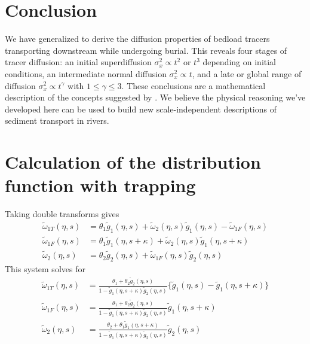 \documentclass[]{agujournal2018}
\newcommand\tom{\tilde{\omega}}
\newcommand\tg{\tilde{g}}
\begin{document}
\section{Conclusion}
We have generalized \citet{Einstein1937} to derive the diffusion properties of bedload tracers transporting downstream while undergoing burial.
This reveals four stages of tracer diffusion: an initial superdiffusion $\sigma_x^2 \propto t^2$ or $t^3$ depending on initial conditions, an intermediate normal diffusion $\sigma_x^2 \propto t$, and a late or global range of diffusion $\sigma_x^2 \propto t^\gamma$ with $1\leq \gamma \leq 3$.
These conclusions are a mathematical description of the concepts suggested by \citet{Nikora2001,Nikora2002}. 
We believe the physical reasoning we've developed here can be used to build new scale-independent descriptions of sediment transport in rivers.

\appendix

\section{Calculation of the distribution function with trapping}
\label{sec:appendix}
Taking double transforms gives
\begin{align}
\tom_{1T}(\eta,s) &= \theta_1 \tg_1(\eta,s) + \tom_2(\eta,s)\tg_1(\eta,s)-\tom_{1F}(\eta,s) \\
\tom_{1F}(\eta,s) &= \theta_1\tg_1(\eta,s+\kappa) + \tom_2(\eta,s)\tg_1(\eta,s+\kappa)\\
\tom_2(\eta,s) &= \theta_2 \tg_2(\eta,s) + \tom_{1F}(\eta,s)\tg_2(\eta,s)
\end{align}
This system solves for 
\begin{align}
\tom_{1T}(\eta,s) &= \frac{\theta_1 + \theta_2 \tg_2(\eta,s)}{1-\tg_1(\eta,s+\kappa)\tg_2(\eta,s)}\big\{\tg_1(\eta,s)-\tg_1(\eta,s+\kappa) \big\} \\
\tom_{1F}(\eta,s) &= \frac{\theta_1 + \theta_2 \tg_2(\eta,s)}{1-\tg_1(\eta,s+\kappa)\tg_2(\eta,s)}\tg_1(\eta,s+\kappa)\\
\tom_{2}(\eta,s) &= \frac{\theta_2 + \theta_1 \tg_1(\eta,s+\kappa)}{1-\tg_1(\eta,s+\kappa)\tg_2(\eta,s)}\tg_2(\eta,s)\\
\end{align}
\end{document}

